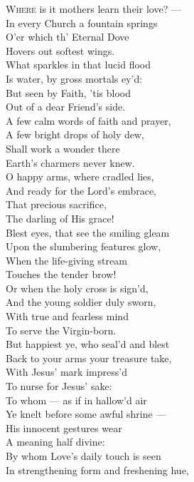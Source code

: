 
\textsc{Where} is it mothers learn their love? — \\
 In every Church a fountain springs \\
 O’er which th’ Eternal Dove \\
 Hovers out softest wings. \\
  What sparkles in that lucid flood \\
 Is water, by gross mortals ey’d: \\
 But seen by Faith, ’tis blood \\
 Out of a dear Friend’s side. \\
  A few calm words of faith and prayer, \\
 A few bright drops of holy dew, \\
 Shall work a wonder there \\
 Earth’s charmers never knew. \\
  O happy arms, where cradled lies, \\
 And ready for the Lord’s embrace, \\
 That precious sacrifice, \\
 The darling of His grace! \\
  Blest eyes, that see the smiling gleam \\
 Upon the slumbering features glow, \\
 When the life-giving stream \\
 Touches the tender brow! \\
  Or when the holy cross is sign’d, \\
 And the young soldier duly sworn, \\
 With true and fearless mind \\
 To serve the Virgin-born. \\
  But happiest ye, who seal’d and blest \\
 Back to your arms your treasure take, \\
 With Jesus’ mark impress’d \\
 To nurse for Jesus’ sake: \\
  To whom — as if in hallow’d air \\
 Ye knelt before some awful shrine — \\
 His innocent gestures wear \\
 A meaning half divine: \\
  By whom Love’s daily touch is seen \\
 In strengthening form and freshening hue, \\
